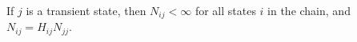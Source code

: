 If $j$ is a transient state, then $N_{ij} < \infty$ for all states $i$ in the chain, and $N_{ij} = H_{ij}N_{jj}$.
